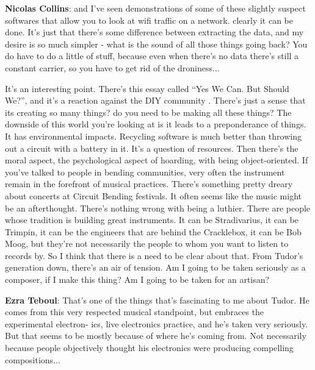 \textbf{Nicolas Collins}: and I’ve seen demonstrations of some of these slightly suspect softwares that allow you to look at wifi traffic on a network. clearly it can be done. It’s just that there’s some difference between extracting the data, and my desire is so much simpler - what is the sound of all those things going back? You do have to do a little of stuff, because even when there’s no data there’s still a constant carrier, so you have to get rid of the droniness...
					
It’s an interesting point. There’s this  essay called ``Yes We Can. But Should We?'', and it’s a reaction against the DIY community \citep{jbwc}. There’s just a sense that its creating so many things? do you need to be making all these things? The downside of this world you’re looking at is it leads to a preponderance of things. It has environmental impacts. Recycling software is much better than throwing out a circuit with a battery in it. It’s a question of resources. Then there’s the moral aspect, the psychological aspect of hoarding, with being object-oriented. If you’ve talked to people in bending communities, very often the instrument remain in the forefront of musical practices. There’s something pretty dreary about concerts at Circuit Bending festivals. It often seems like the music might be an afterthought. There’s nothing wrong with being a luthier. There are people whose tradition is building great instruments. It can be Stradivarius, it can be Trimpin, it can be the engineers that are behind the Cracklebox, it can be Bob Moog, but they’re not necessarily the people to whom you want to listen to records by. So I think that there is a need to be clear about that. From Tudor’s generation down, there’s an air of tension. Am I going to be taken seriously as a composer, if I make this thing? Am I going to be taken for an artisan?
					
\textbf{Ezra Teboul}: That’s one of the things that’s fascinating to me about Tudor. He comes from this very respected musical standpoint, but embraces the experimental electron- ics, live electronics practice, and he’s taken very seriously. But that seems to be mostly because of where he’s coming from. Not necessarily because people objectively thought his electronics were producing compelling compositions...
					
